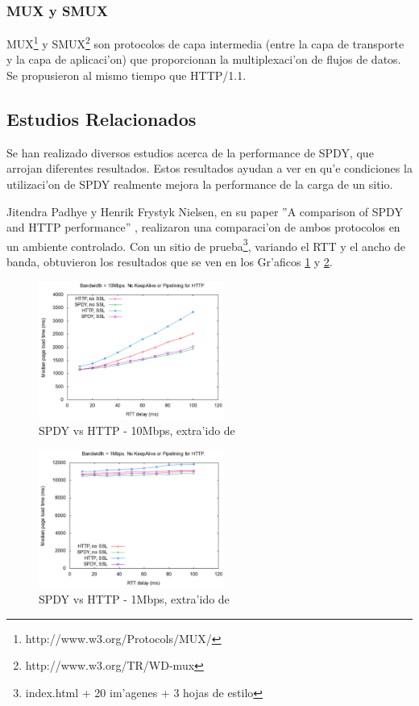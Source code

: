 \subsubsection{MUX y SMUX}

MUX\footnote{http://www.w3.org/Protocols/MUX/} y SMUX\footnote{http://www.w3.org/TR/WD-mux} son protocolos de capa intermedia (entre la capa de transporte y la capa de aplicaci'on) que proporcionan la multiplexaci'on de flujos de datos. Se propusieron al mismo tiempo que HTTP/1.1.

\subsection{Estudios Relacionados}
\label{estudiosSPDY}
Se han realizado diversos estudios acerca de la performance de SPDY, que arrojan diferentes resultados. Estos resultados ayudan a ver en qu'e condiciones la utilizaci'on de SPDY realmente mejora la performance de la carga de un sitio.

Jitendra Padhye y Henrik Frystyk Nielsen, en su paper ''A comparison of SPDY and HTTP performance'' \citep{comparision}, realizaron una comparaci'on de ambos protocolos en un ambiente controlado. Con un sitio de prueba\footnote{index.html + 20 im'agenes + 3 hojas de estilo}, variando el RTT y el ancho de banda, obtuvieron los resultados que se ven en los Gr'aficos \ref{comparision1} y \ref{comparision2}.

\begin{figure}[ht!]
  	\centering
	\includegraphics[width=230px]{img/comparision1}
	\caption{\small SPDY vs HTTP - 10Mbps, extra'ido de \citep{comparision}}
	\label{comparision1}
\end{figure}

\begin{figure}[ht!]
  	\centering
	\includegraphics[width=230px]{img/comparision2}
	\caption{\small SPDY vs HTTP - 1Mbps, extra'ido de \citep{comparision}}
	\label{comparision2}
\end{figure}

